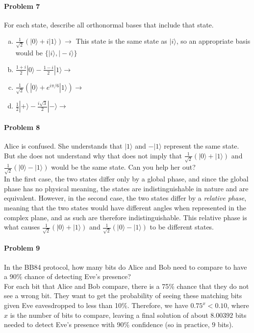 \documentclass[12pt]{article}
\theoremstyle{mytheor}
\begin{document}
\paragraph{Problem 7} For each state, describe all orthonormal bases that include that state.
\begin{enumerate}[a)] %
\item $\frac{1}{\sqrt{2}}(|0\rangle + i|1\rangle) \rightarrow$ This state is the same state as $|i\rangle$, so an appropriate basis would be $\{|i\rangle,|-i\rangle\}$
\item $\frac{1+i}{2}|0\rangle - \frac{1-i}{2}|1\rangle \rightarrow$
\item $\frac{1}{\sqrt{2}}(|0\rangle + e^{i\pi/6}|1\rangle) \rightarrow$
\item $\frac{1}{2}|+\rangle - \frac{i\sqrt{3}}{2}|-\rangle \rightarrow$
\end{enumerate}

\paragraph{Problem 8} Alice is confused. She understands that $|1\rangle$ and $-|1\rangle$ represent the same state. But she does not understand why that does not imply that $\frac{1}{\sqrt{2}}(|0\rangle + |1\rangle)$ and $\frac{1}{\sqrt{2}}(|0\rangle - |1\rangle)$ would be the same state. Can you help her out?\\
In the first case, the two states differ only by a global phase, and since the global phase has no physical meaning, the states are indistinguishable in nature and are equivalent. However, in the second case, the two states differ by a \textit{relative phase}, meaning that the two states would have different angles when represented in the complex plane, and as such are therefore indistinguishable. This relative phase is what causes $\frac{1}{\sqrt{2}}(|0\rangle + |1\rangle)$ and $\frac{1}{\sqrt{2}}(|0\rangle - |1\rangle)$ to be different states.

\paragraph{Problem 9} In the BB84 protocol, how many bits do Alice and Bob need to compare to have a 90\% chance of detecting Eve's presence?\\
For each bit that Alice and Bob compare, there is a 75\% chance that they do not see a wrong bit. They want to get the probability of seeing these matching bits given Eve eavesdropped to less than 10\%. Therefore, we have $0.75^x<0.10$, where $x$ is the number of bits to compare, leaving a final solution of about $8.00392$ bits needed to detect Eve's presence with 90\% confidence (so in practice, $9$ bits).
\end{document}
